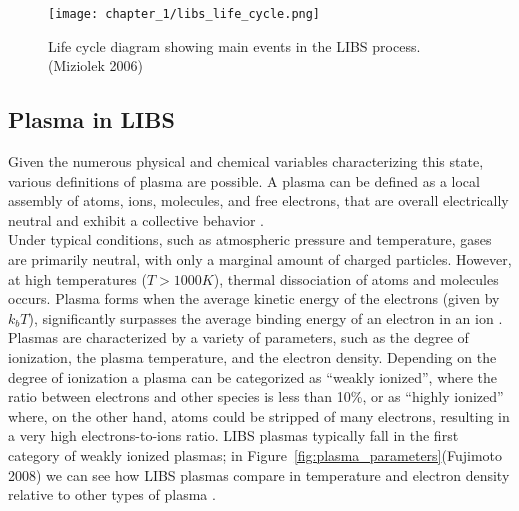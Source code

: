\begin{figure}[H]
    \centering
    \texttt{[image: chapter\_1/libs\_life\_cycle.png]}
    \caption[LIBS life cycle.]{ Life cycle diagram showing main events in the LIBS process. (Miziolek 2006)}
    \label{fig:libs_life_cycle}
\end{figure}


\subsection{Plasma in LIBS}
\label{subsec:plasma_in_libs}
Given the numerous physical and chemical variables characterizing this state, various definitions of plasma are possible. A plasma can be defined as a local assembly of atoms, ions, molecules, and free electrons, that are overall electrically neutral and exhibit a collective behavior \cite{bittencourtFundamentalsPlasmaPhysics2004}.
\\
Under typical conditions, such as atmospheric pressure and temperature, gases are primarily neutral, with only a marginal amount of charged particles. However, at high temperatures ($T > 1000K$), thermal dissociation of atoms and molecules occurs. Plasma forms when the average kinetic energy of the electrons (given by $k_bT$), significantly surpasses the average binding energy of an electron in an ion \cite{bellanFundamentalsPlasmaPhysics2006}.
\\
Plasmas are characterized by a variety of parameters, such as the degree of ionization, the plasma temperature, and the electron density. Depending on the degree of ionization a plasma can be categorized as “weakly ionized”, where the ratio between electrons and other species is less than 10\%, or as “highly ionized” where, on the other hand, atoms could be stripped of many electrons, resulting in a very high electrons-to-ions ratio. LIBS plasmas typically fall in the first category of weakly ionized plasmas; in Figure~\ref{fig:plasma_parameters}(Fujimoto 2008) we can see how LIBS plasmas compare in temperature and electron density relative to other types of plasma \cite{ApparatusFundamentals2006}.

